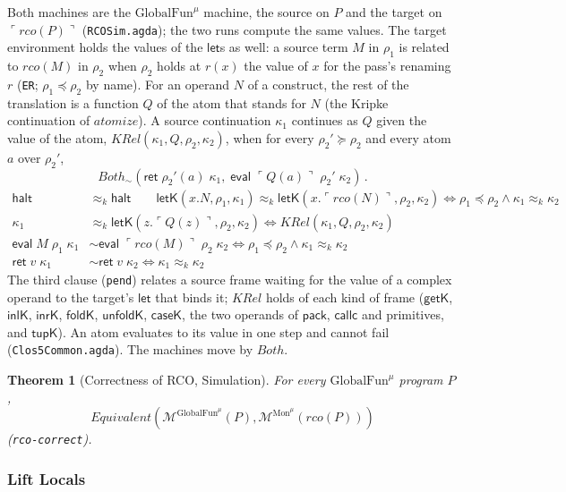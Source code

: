 \documentclass[10pt]{article}
\theoremstyle{acmplain}
\newtheorem{theorem}{Theorem}[section]
\newcommand{\key}[1]{\mathsf{#1}}
\newcommand{\pass}[1]{\mathit{#1}}
\newcommand{\ev}[3]{\key{eval}\;#1\;#2\;#3}
\newcommand{\rt}[2]{\key{ret}\;#1\;#2}
\newcommand{\Mach}[1]{\mathcal{M}^{#1}}
\newcommand{\Equiv}{\mathit{Equivalent}}
\newcommand{\Kf}[2]{\key{#1}(#2)}
\newcommand{\halt}{\key{halt}}
\newcommand{\approxk}{\approx_k}
\newcommand{\Tembed}[1]{\ulcorner #1 \urcorner}  %
\newcommand{\Ml}[1]{\textrm{#1}^{\mu}}                  %
\begin{document}
Both machines are the $\Ml{GlobalFun}$ machine, the source on $P$ and the target
on $\Tembed{\pass{rco}(P)}$ (\texttt{RCOSim.agda}); the two runs compute the
same values. The target environment holds the values of the $\key{let}$s
as well: a source term $M$ in $\rho_1$ is related to $\pass{rco}(M)$ in
$\rho_2$ when $\rho_2$ holds at $r(x)$ the value of $x$ for the pass's
renaming $r$ (\texttt{ER}; $\rho_1 \preceq \rho_2$ by name). For an operand
$N$ of a construct, the rest of the translation is a function $Q$ of the
atom that stands for $N$ (the Kripke continuation of $\pass{atomize}$). A
source continuation $\kappa_1$ continues as $Q$ given the value of the
atom, $\mathit{KRel}(\kappa_1, Q, \rho_2, \kappa_2)$, when for every
$\rho_2' \succeq \rho_2$ and every atom $a$ over $\rho_2'$,
\[ \mathit{Both}_\sim(\rt{\rho_2'(a)}{\kappa_1},\; \ev{\Tembed{Q(a)}}{\rho_2'}{\kappa_2})\,. \]
\begin{align*}
  \halt &\approxk \halt \qquad
  \Kf{letK}{x.N, \rho_1, \kappa_1} \approxk \Kf{letK}{x.\Tembed{\pass{rco}(N)}, \rho_2, \kappa_2}
    \iff \rho_1 \preceq \rho_2 \land \kappa_1 \approxk \kappa_2 \\
  \kappa_1 &\approxk \Kf{letK}{z.\Tembed{Q(z)}, \rho_2, \kappa_2}
    \iff \mathit{KRel}(\kappa_1, Q, \rho_2, \kappa_2) \\
  \ev{M}{\rho_1}{\kappa_1} &\sim \ev{\Tembed{\pass{rco}(M)}}{\rho_2}{\kappa_2}
    \iff \rho_1 \preceq \rho_2 \land \kappa_1 \approxk \kappa_2 \\
  \rt{v}{\kappa_1} &\sim \rt{v}{\kappa_2} \iff \kappa_1 \approxk \kappa_2
\end{align*}
The third clause (\texttt{pend}) relates a source frame waiting for the
value of a complex operand to the target's $\key{let}$ that binds it;
$\mathit{KRel}$ holds of each kind of frame ($\key{getK}$, $\key{inlK}$,
$\key{inrK}$, $\key{foldK}$, $\key{unfoldK}$, $\key{caseK}$, the two
operands of $\key{pack}$, $\key{callc}$ and primitives, and $\key{tupK}$).
An atom evaluates to its value in one step and cannot fail
(\texttt{Clos5Common.agda}). The machines move by $\mathit{Both}$.
\begin{theorem}[Correctness of RCO, Simulation]\label{thm:m-cek-rco}
For every $\Ml{GlobalFun}$ program $P$,
\[ \Equiv(\Mach{\Ml{GlobalFun}}(P), \Mach{\Ml{Mon}}(\pass{rco}(P))) \]
(\texttt{rco-correct}).
\end{theorem}

\subsubsection{Lift Locals}
\end{document}
